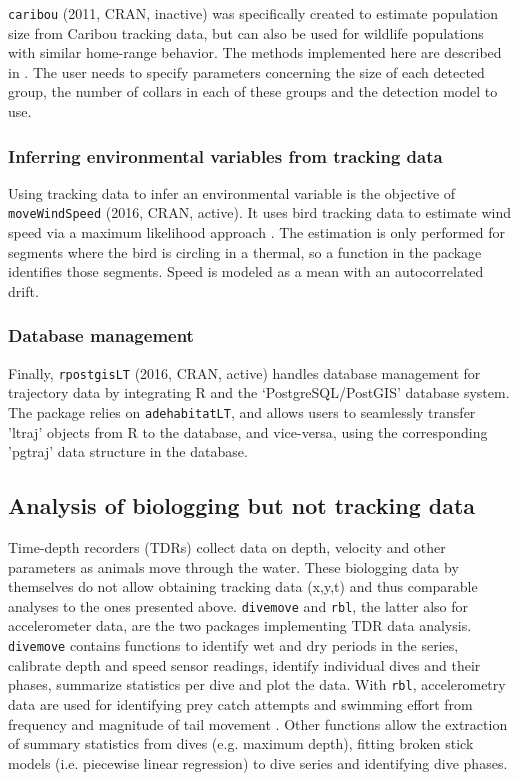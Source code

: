 \documentclass[a4paper,12pt]{article}
\newcommand{\Rpkg}[1]{\texttt{#1}}
\begin{document}
\Rpkg{caribou} (2011, CRAN, inactive) was specifically created to estimate population size from Caribou tracking data, but can also be used for wildlife populations with similar home-range behavior. The methods implemented here are described in \cite{Rivest1998}. The user needs to specify parameters concerning the size of each detected group, the number of collars in each of these groups and the detection model to use. 

\subsubsection*{Inferring environmental variables from tracking data}

Using tracking data to infer an environmental variable is the objective of \Rpkg{moveWindSpeed} (2016, CRAN, active). It uses bird tracking data to estimate wind speed via a maximum likelihood approach \citep{Weinzierl2016}. The estimation is only performed for segments where the bird is circling in a thermal, so a function in the package identifies those segments. Speed is modeled as a mean with an autocorrelated drift. 

\subsubsection*{Database management}

Finally, \Rpkg{rpostgisLT} (2016, CRAN, active) handles database management for trajectory data by integrating R and the `PostgreSQL/PostGIS' database system. The package relies on \Rpkg{adehabitatLT}, and allows users to seamlessly transfer 'ltraj' objects from R to the database, and vice-versa, using the corresponding 'pgtraj' data structure in the database. %

\subsection*{Analysis of biologging but not tracking data}

Time-depth recorders (TDRs) collect data on depth, velocity and other parameters as animals move through the water. These biologging data by themselves do not allow obtaining tracking data (x,y,t) and thus comparable analyses to the ones presented above. \Rpkg{divemove} and \Rpkg{rbl}, the latter also for accelerometer data, are the two packages implementing TDR data analysis. \Rpkg{divemove} contains functions to identify wet and dry periods in the series, calibrate depth and speed sensor readings, identify individual dives and their phases, summarize statistics per dive and plot the data. With \Rpkg{rbl}, accelerometry data are used for identifying prey catch attempts \citep{Viviant2010} and swimming effort from frequency and magnitude of tail movement \citep{Bras2016}. Other functions allow the extraction of summary statistics from dives (e.g. maximum depth), fitting broken stick models (i.e. piecewise linear regression) to dive series and identifying dive phases. 
\end{document}

